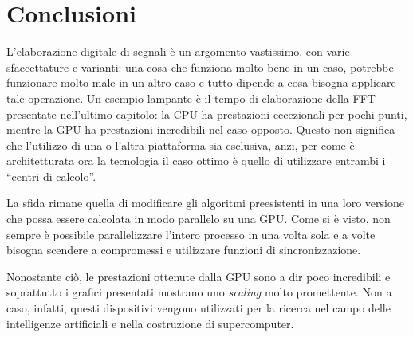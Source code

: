 \chapter{Conclusioni}
L'elaborazione digitale di segnali è un argomento vastissimo, con varie sfaccettature e varianti: una cosa che funziona molto bene in un caso, potrebbe funzionare molto male in un altro caso e tutto dipende a cosa bisogna applicare tale operazione. Un esempio lampante è il tempo di elaborazione della FFT presentate nell'ultimo capitolo: la CPU ha prestazioni eccezionali per pochi punti, mentre la GPU ha prestazioni incredibili nel caso opposto. Questo non significa che l'utilizzo di una o l'altra piattaforma sia esclusiva, anzi, per come è architetturata ora la tecnologia il caso ottimo è quello di utilizzare entrambi i ``centri di calcolo''.

La sfida rimane quella di modificare gli algoritmi preesistenti in una loro versione che possa essere calcolata in modo parallelo su una GPU. Come si è visto, non sempre è possibile parallelizzare l'intero processo in una volta sola e a volte bisogna scendere a compromessi e utilizzare funzioni di sincronizzazione. 

Nonostante ciò, le prestazioni ottenute dalla GPU sono a dir poco incredibili e soprattutto i grafici presentati mostrano uno \textit{scaling} molto promettente. Non a caso, infatti, questi dispositivi vengono utilizzati per la ricerca nel campo delle intelligenze artificiali e nella costruzione di supercomputer.